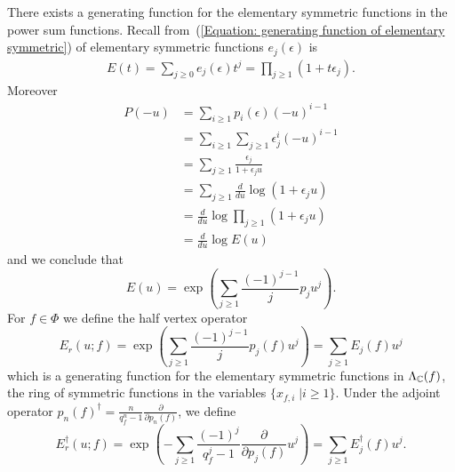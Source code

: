 There exists a generating function for the elementary symmetric functions in the power sum functions.  Recall from~(\ref{Equation: generating function of elementary symmetric}) of elementary symmetric functions $e_j(\epsilon)$ is
\begin{equation}
    \begin{split}
        E(t) = \sum_{j\geq0}e_j(\epsilon)t^j=\prod_{j\geq1}(1+t\epsilon_j).
    \end{split}
\end{equation}
Moreover 
\begin{equation}
\begin{split}
      P(-u) &= \sum_{i\geq1}p_i(\epsilon)(-u)^{i-1}\\
      &=\sum_{i\geq1}\sum_{j\geq1}\epsilon_j^i(-u)^{i-1}\\
      &=\sum_{j\geq1}\frac{\epsilon_j}{1+\epsilon_ju}\\
      &=\sum_{j\geq1}\frac{d}{du}\log(1+\epsilon_ju)\\
      &=\frac{d}{du}\log\prod_{j\geq1}(1+\epsilon_ju)\\
      &=\frac{d}{du}\log E(u)
\end{split}
\end{equation}
and we conclude that
\begin{equation}
    E(u)=\exp\left(\sum_{j\geq1}\frac{(-1)^{j-1}}{j}p_ju^j\right).
\end{equation}
For $f\in\Phi$ we define the half vertex operator
\begin{equation}
    E_r(u;f)=\exp\left(\sum_{j\geq1}\frac{(-1)^{j-1}}{j}p_j(f)u^j\right)=\sum_{j\geq1}E_j(f)u^j
\end{equation}
which is a generating function for the elementary symmetric functions in $\Lambda_{\mathbb{C}}(f)$, the ring of symmetric functions in the variables $\{x_{f,i}\;|i\geq1\}$. Under the adjoint operator $p_n(f)^\dagger=\frac{n}{q_f^n-1}\frac{\partial}{\partial p_n(f)}$, we define
\begin{equation}
    E_r^\dagger(u;f)=\exp\left(-\sum_{j\geq1}\frac{(-1)^{j}}{q_f^j-1}\frac{\partial}{\partial p_j(f)}u^j\right)=\sum_{j\geq1}E_j^\dagger(f)u^j.
\end{equation}


